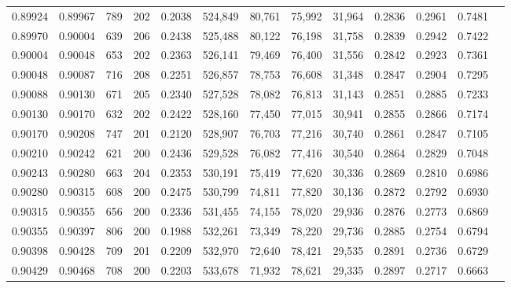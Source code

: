 \begin{tabular}{rrrrrrrrrrrrr}
0.89924 & 0.89967 &   789 & 202 &                                     0.2038 & 524,849 &  80,761 &  75,992 &  31,964 & 0.2836 & 0.2961 & 0.7481 \\
0.89970 & 0.90004 &   639 & 206 &                                     0.2438 & 525,488 &  80,122 &  76,198 &  31,758 & 0.2839 & 0.2942 & 0.7422 \\
0.90004 & 0.90048 &   653 & 202 &                                     0.2363 & 526,141 &  79,469 &  76,400 &  31,556 & 0.2842 & 0.2923 & 0.7361 \\
0.90048 & 0.90087 &   716 & 208 &                                     0.2251 & 526,857 &  78,753 &  76,608 &  31,348 & 0.2847 & 0.2904 & 0.7295 \\
0.90088 & 0.90130 &   671 & 205 &                                     0.2340 & 527,528 &  78,082 &  76,813 &  31,143 & 0.2851 & 0.2885 & 0.7233 \\
0.90130 & 0.90170 &   632 & 202 &                                     0.2422 & 528,160 &  77,450 &  77,015 &  30,941 & 0.2855 & 0.2866 & 0.7174 \\
0.90170 & 0.90208 &   747 & 201 &                                     0.2120 & 528,907 &  76,703 &  77,216 &  30,740 & 0.2861 & 0.2847 & 0.7105 \\
0.90210 & 0.90242 &   621 & 200 &                                     0.2436 & 529,528 &  76,082 &  77,416 &  30,540 & 0.2864 & 0.2829 & 0.7048 \\
0.90243 & 0.90280 &   663 & 204 &                                     0.2353 & 530,191 &  75,419 &  77,620 &  30,336 & 0.2869 & 0.2810 & 0.6986 \\
0.90280 & 0.90315 &   608 & 200 &                                     0.2475 & 530,799 &  74,811 &  77,820 &  30,136 & 0.2872 & 0.2792 & 0.6930 \\
0.90315 & 0.90355 &   656 & 200 &                                     0.2336 & 531,455 &  74,155 &  78,020 &  29,936 & 0.2876 & 0.2773 & 0.6869 \\
0.90355 & 0.90397 &   806 & 200 &                                     0.1988 & 532,261 &  73,349 &  78,220 &  29,736 & 0.2885 & 0.2754 & 0.6794 \\
0.90398 & 0.90428 &   709 & 201 &                                     0.2209 & 532,970 &  72,640 &  78,421 &  29,535 & 0.2891 & 0.2736 & 0.6729 \\
0.90429 & 0.90468 &   708 & 200 &                                     0.2203 & 533,678 &  71,932 &  78,621 &  29,335 & 0.2897 & 0.2717 & 0.6663 \\

\end{tabular}
